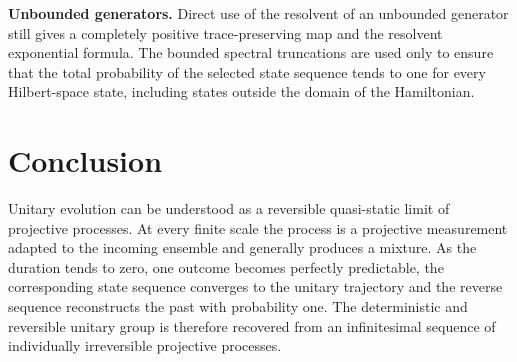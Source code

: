 \documentclass{techbrief}
\begin{document}
\textbf{Unbounded generators.} Direct use of the resolvent of an unbounded generator still gives a completely positive trace-preserving map and the resolvent exponential formula. The bounded spectral truncations are used only to ensure that the total probability of the selected state sequence tends to one for every Hilbert-space state, including states outside the domain of the Hamiltonian.

\section{Conclusion}

Unitary evolution can be understood as a reversible quasi-static limit of projective processes. At every finite scale the process is a projective measurement adapted to the incoming ensemble and generally produces a mixture. As the duration tends to zero, one outcome becomes perfectly predictable, the corresponding state sequence converges to the unitary trajectory and the reverse sequence reconstructs the past with probability one. The deterministic and reversible unitary group is therefore recovered from an infinitesimal sequence of individually irreversible projective processes.
\end{document}
